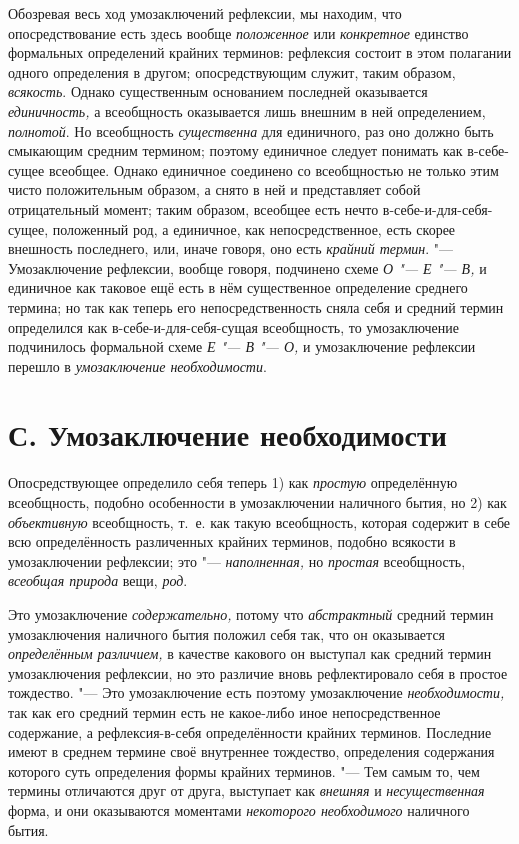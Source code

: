 Обозревая весь ход умозаключений рефлексии, мы находим, что
опосредствование есть здесь вообще
{\em положенное} или
{\em конкретное} единство
формальных определений крайних терминов: рефлексия состоит в этом полагании
одного определения в другом; опосредствующим служит, таким образом,
{\em всякость}. Однако
существенным основанием последней оказывается
{\em единичность,} а
всеобщность оказывается лишь внешним в ней определением,
{\em полнотой}. Но
всеобщность {\em существенна}
для единичного, раз оно должно быть смыкающим средним
термином; поэтому единичное следует понимать как в-себе-сущее всеобщее.
Однако единичное соединено со всеобщностью не только этим чисто
положительным образом, а снято в ней и представляет собой отрицательный
момент; таким образом, всеобщее есть нечто в-себе-и-для-себя-сущее,
положенный род, а единичное, как непосредственное, есть скорее внешность
последнего, или, иначе говоря, оно есть
{\em крайний термин}. "---
Умозаключение рефлексии, вообще говоря, подчинено схеме
{\em О "--- Е "--- В,}
и единичное как таковое ещё есть в нём существенное
определение среднего термина; но так как теперь его непосредственность
сняла себя и средний термин определился как
в-себе-и-для-себя-сущая всеобщность, то умозаключение
подчинилось формальной схеме {\em Е
"--- В "--- О,} и умозаключение
рефлексии перешло в {\em умозаключение
необходимости}.

\section[С. Умозаключение необходимости]{С. Умозаключение необходимости}

Опосредствующее определило себя теперь 1) как
{\em простую}
определённую всеобщность, подобно особенности в умозаключении
наличного бытия, но 2) как
{\em объективную}
всеобщность, т.~е. как такую всеобщность, которая содержит в
себе всю определённость различенных крайних терминов, подобно всякости в
умозаключении рефлексии; это
"--- {\em наполненная,} но
{\em простая}
всеобщность, {\em всеобщая
природа} вещи,
{\em род}.

Это умозаключение
{\em содержательно,}
потому что
{\em абстрактный} средний
термин умозаключения наличного бытия положил себя так, что он оказывается
{\em определённым различием,}
в качестве какового он выступал как средний термин
умозаключения рефлексии, но это различие вновь рефлектировало себя в
простое тождество. "--- Это умозаключение есть поэтому
умозаключение {\em необходимости,}
так как его средний термин есть не какое-либо иное
непосредственное содержание, а рефлексия-в-себя определённости крайних
терминов. Последние имеют в среднем термине своё внутреннее тождество,
определения содержания которого суть определения формы крайних терминов. "---
Тем самым то, чем термины отличаются друг от друга, выступает
как {\em внешняя} и
{\em несущественная}
форма, и они оказываются моментами
{\em некоторого необходимого}
наличного бытия.

